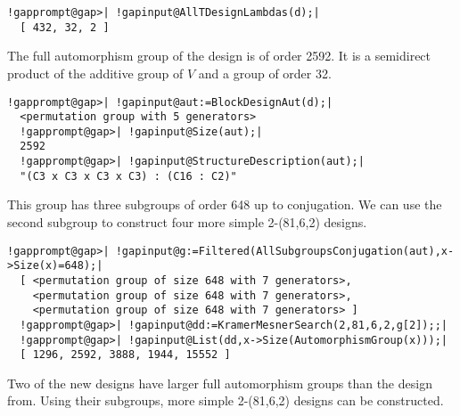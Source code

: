 \documentclass[a4paper,11pt]{report}
\begin{document}
{{{\begin{Verbatim}[commandchars=!@|,fontsize=\small,frame=single,label=Example]
  !gapprompt@gap>| !gapinput@AllTDesignLambdas(d);|
  [ 432, 32, 2 ]
\end{Verbatim}
 The full automorphism group of the design is of order 2592. It is a semidirect
product of the additive group of $V$ and a group of order 32. 
\begin{Verbatim}[commandchars=!@|,fontsize=\small,frame=single,label=Example]
  !gapprompt@gap>| !gapinput@aut:=BlockDesignAut(d);|
  <permutation group with 5 generators>
  !gapprompt@gap>| !gapinput@Size(aut);|
  2592
  !gapprompt@gap>| !gapinput@StructureDescription(aut);|
  "(C3 x C3 x C3 x C3) : (C16 : C2)"
\end{Verbatim}
 This group has three subgroups of order 648 up to conjugation. We can use the
second subgroup to construct four more simple 2-(81,6,2) designs. 
\begin{Verbatim}[commandchars=!@|,fontsize=\small,frame=single,label=Example]
  !gapprompt@gap>| !gapinput@g:=Filtered(AllSubgroupsConjugation(aut),x->Size(x)=648);|
  [ <permutation group of size 648 with 7 generators>, 
    <permutation group of size 648 with 7 generators>, 
    <permutation group of size 648 with 7 generators> ]
  !gapprompt@gap>| !gapinput@dd:=KramerMesnerSearch(2,81,6,2,g[2]);;|
  !gapprompt@gap>| !gapinput@List(dd,x->Size(AutomorphismGroup(x)));|
  [ 1296, 2592, 3888, 1944, 15552 ]
\end{Verbatim}
 Two of the new designs have larger full automorphism groups than the design
from{\nobreakspace}\cite{AN21}. Using their subgroups, more simple 2-(81,6,2) designs can be constructed. }

 
}}
\end{document}
